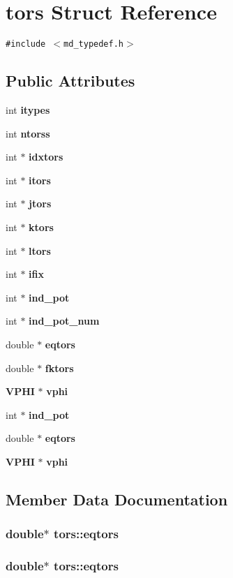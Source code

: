\section{tors Struct Reference}
\label{structtors}
{\tt \#include $<$md\_\-typedef.h$>$}

\subsection*{Public Attributes}
\begin{CompactItemize}
\item 
int {\bf itypes}
\item 
int {\bf ntorss}
\item 
int $\ast$ {\bf idxtors}
\item 
int $\ast$ {\bf itors}
\item 
int $\ast$ {\bf jtors}
\item 
int $\ast$ {\bf ktors}
\item 
int $\ast$ {\bf ltors}
\item 
int $\ast$ {\bf ifix}
\item 
int $\ast$ {\bf ind\_\-pot}
\item 
int $\ast$ {\bf ind\_\-pot\_\-num}
\item 
double $\ast$ {\bf eqtors}
\item 
double $\ast$ {\bf fktors}
\item 
{\bf VPHI} $\ast$ {\bf vphi}
\item 
int $\ast$ {\bf ind\_\-pot}
\item 
double $\ast$ {\bf eqtors}
\item 
{\bf VPHI} $\ast$ {\bf vphi}
\end{CompactItemize}


\subsection{Member Data Documentation}
\subsubsection{\setlength{\rightskip}{0pt plus 5cm}double$\ast$ {\bf tors::eqtors}}\label{structtors_8662fc5adc94b6788bc6a57e1e2f9f68}


\subsubsection{\setlength{\rightskip}{0pt plus 5cm}double$\ast$ {\bf tors::eqtors}}\label{structtors_8662fc5adc94b6788bc6a57e1e2f9f68}


